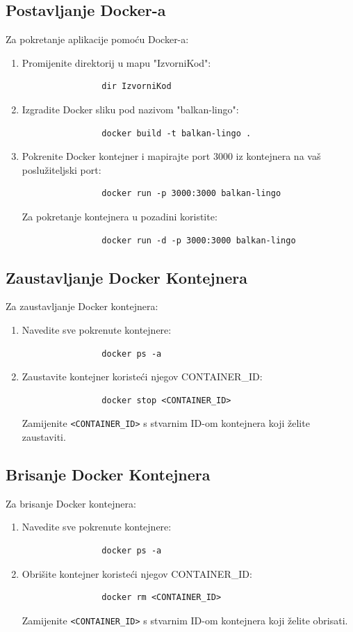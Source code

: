 		\subsection*{Postavljanje Docker-a}
		Za pokretanje aplikacije pomoću Docker-a:
		\begin{enumerate}
			\item Promijenite direktorij u mapu "IzvorniKod":
			\begin{verbatim}
				dir IzvorniKod
			\end{verbatim}
			\item Izgradite Docker sliku pod nazivom "balkan-lingo":
			\begin{verbatim}
				docker build -t balkan-lingo .
			\end{verbatim}
			\item Pokrenite Docker kontejner i mapirajte port 3000 iz kontejnera na vaš poslužiteljski port:
			\begin{verbatim}
				docker run -p 3000:3000 balkan-lingo
			\end{verbatim}
			Za pokretanje kontejnera u pozadini koristite:
			\begin{verbatim}
				docker run -d -p 3000:3000 balkan-lingo
			\end{verbatim}
		\end{enumerate}
		
		\subsection*{Zaustavljanje Docker Kontejnera}
		Za zaustavljanje Docker kontejnera:
		\begin{enumerate}
			\item Navedite sve pokrenute kontejnere:
			\begin{verbatim}
				docker ps -a
			\end{verbatim}
			\item Zaustavite kontejner koristeći njegov CONTAINER\_ID:
			\begin{verbatim}
				docker stop <CONTAINER_ID>
			\end{verbatim}
			Zamijenite \texttt{<CONTAINER\_ID>} s stvarnim ID-om kontejnera koji želite zaustaviti.
		\end{enumerate}

		\subsection*{Brisanje Docker Kontejnera}
		Za brisanje Docker kontejnera:
		\begin{enumerate}
			\item Navedite sve pokrenute kontejnere:
			\begin{verbatim}
				docker ps -a
			\end{verbatim}
			\item Obrišite kontejner koristeći njegov CONTAINER\_ID:
			\begin{verbatim}
				docker rm <CONTAINER_ID>
			\end{verbatim}
			Zamijenite \texttt{<CONTAINER\_ID>} s stvarnim ID-om kontejnera koji želite obrisati.
		\end{enumerate}

